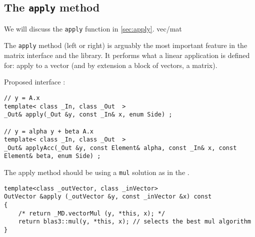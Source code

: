 \subsection{The \texttt{apply} method}
%
We will discuss the \texttt{apply} function in \cref{sec:apply}.
vec/mat
%
\par
%
The \texttt{apply} method (left or right) is arguably the most important feature in the
matrix interface and the \linbox library. It performs what a linear application is defined for:
apply to a vector (and by extension  a block of vectors, \ie a matrix).
%
\par
%
Proposed interface :
%
{
\begin{lstlisting}
// y = A.x
template< class _In, class _Out  >
_Out& apply(_Out &y, const _In& x, enum Side) ;

// y = alpha y + beta A.x
template< class _In, class _Out  >
_Out& applyAcc(_Out &y, const Element& alpha, const _In& x, const Element& beta, enum Side) ;

\end{lstlisting}
}
%
The apply method should be using a \texttt{mul} solution as in the .
{
\begin{lstlisting}
template<class _outVector, class _inVector>
OutVector &apply (_outVector &y, const _inVector &x) const
{
	/* return _MD.vectorMul (y, *this, x); */
	return blas3::mul(y, *this, x); // selects the best mul algorithm
}
\end{lstlisting}
}
%
